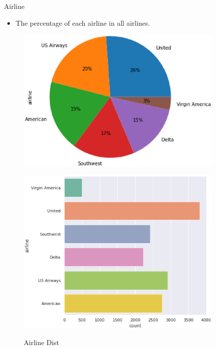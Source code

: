 \documentclass[
 size=14pt,
 paper=smartboard,  %
 mode=present, 		%
 display=slides, 	%
 style=tuliplab,  	%
 pauseslide,
 fleqn,leqno]{powerdot}
\begin{document}
\begin{slide}[toc=,bm=]{Airline}
  \begin{itemize}
    \item The percentage of each airline in all airlines.
  \end{itemize}
  
  \begin{figure}[htbp]
    \centering
    \begin{minipage}[t]{0.48\textwidth}
      \centering
      \includegraphics[width=0.9\textwidth]{figures//airlinemap.eps}\\
      \vspace{-1.4em}
      \caption{Airline Map}
    \end{minipage}
    \begin{minipage}[t]{0.48\textwidth}
      \centering
      \includegraphics[width=0.9\textwidth]{figures//airlinedist.eps}\\
      \vspace{-1.4em}
      \caption{Airline Dist}
    \end{minipage}
  \end{figure}
\end{slide}
\end{document}

